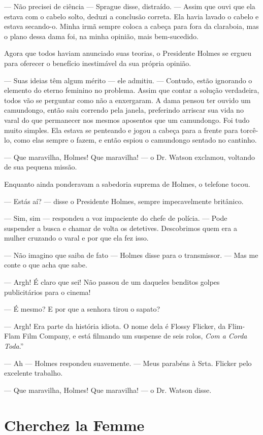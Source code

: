 --- Não precisei de ciência --- Sprague disse, distraído. --- Assim que
ouvi que ela estava com o cabelo solto, deduzi a conclusão correta. Ela
havia lavado o cabelo e estava secando-o. Minha irmã sempre coloca a
cabeça para fora da claraboia, mas o plano dessa dama foi, na minha
opinião, mais bem-sucedido.

Agora que todos haviam anunciado suas teorias, o Presidente Holmes se
ergueu para oferecer o benefício inestimável da sua própria opinião.

--- Suas ideias têm algum mérito --- ele admitiu. --- Contudo, estão
ignorando o elemento do eterno feminino no problema. Assim que contar a
solução verdadeira, todos vão se perguntar como não a enxergaram. A dama
pensou ter ouvido um camundongo, então saiu correndo pela janela,
preferindo arriscar sua vida no varal do que permanecer nos mesmos
aposentos que um camundongo. Foi tudo muito simples. Ela estava se
penteando e jogou a cabeça para a frente para torcê-lo, como elas sempre
o fazem, e então espiou o camundongo sentado no cantinho.

--- Que maravilha, Holmes! Que maravilha! --- o Dr. Watson exclamou,
voltando de sua pequena missão.

Enquanto ainda ponderavam a sabedoria suprema de Holmes, o telefone
tocou.

--- Estás aí? --- disse o Presidente Holmes, sempre impecavelmente
britânico.

--- Sim, sim --- respondeu a voz impaciente do chefe de polícia. ---
Pode suspender a busca e chamar de volta os detetives. Descobrimos quem
era a mulher cruzando o varal e por que ela fez isso.

--- Não imagino que saiba de fato --- Holmes disse para o transmissor.
--- Mas me conte o que acha que sabe.

--- Argh! É claro que sei! Não passou de um daqueles benditos golpes
publicitários para o cinema!

--- É mesmo? E por que a senhora tirou o sapato?

--- Argh! Era parte da história idiota. O nome dela é Flossy Flicker, da
Flim-Flam Film Company, e está filmando um suspense de seis rolos,
\emph{Com a Corda Toda}.''

--- Ah --- Holmes respondeu suavemente. --- Meus parabéns à Srta.
Flicker pelo excelente trabalho.

--- Que maravilha, Holmes! Que maravilha! --- o Dr. Watson disse.

\chapter{Cherchez la Femme}

